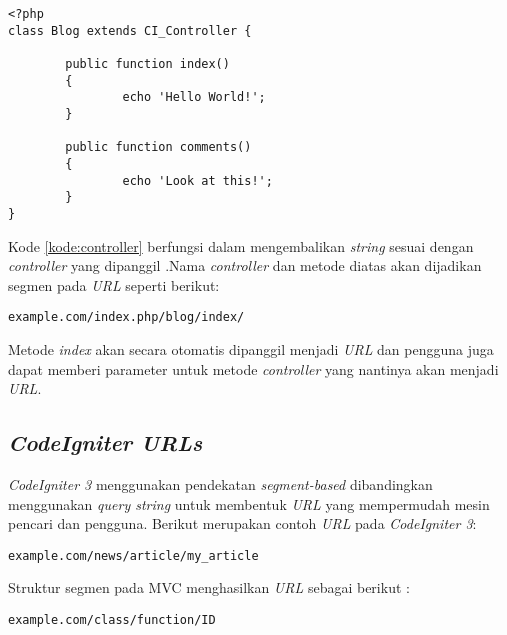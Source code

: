 \begin{lstlisting}[caption=Contoh \textit{controller} pada \textit{CodeIgniter 3}, label=kode:controller]
<?php
class Blog extends CI_Controller {

        public function index()
        {
                echo 'Hello World!';
        }

        public function comments()
        {
                echo 'Look at this!';
        }
}
\end{lstlisting}

Kode \ref{kode:controller} berfungsi dalam mengembalikan \textit{string} sesuai dengan \textit{controller} yang dipanggil .Nama \textit{controller} dan metode diatas akan dijadikan segmen pada \textit{URL} seperti berikut:

\begin{center}
\verb|example.com/index.php/blog/index/|
\end{center}

Metode \textit{index} akan secara otomatis dipanggil menjadi \textit{URL} dan pengguna juga dapat memberi parameter untuk metode \textit{controller} yang nantinya akan menjadi \textit{URL}.

\iffalse
Overview bisa disatuin aja jadi epndahuluan (Flowchart and MVC).
General topic subsubbab.
Sisanya desesuain sama yg dipake Judge dan kalo ada bab yg bisa disatuin disatuin aja(libraries di general topic/helpers).
\textit{CodeIgniter 3} memiliki beragam fungsi untuk mempermudah pengguna dalam membentuk aplikasi web. Berikut merupakan fungsi-fungsi yang ada pada \textit{CodeIgniter 3}:
\fi

\subsection{\textit{CodeIgniter URLs}}

\textit{CodeIgniter 3} menggunakan pendekatan \textit{segment-based} dibandingkan menggunakan \textit{query string} untuk membentuk \textit{URL} yang mempermudah mesin pencari dan pengguna. Berikut merupakan contoh \textit{URL} pada \textit{CodeIgniter 3}:

\begin{center}
\verb|example.com/news/article/my_article|
\end{center}

Struktur segmen pada MVC menghasilkan \textit{URL} sebagai berikut :

\begin{center}
\verb|example.com/class/function/ID|
\end{center}

